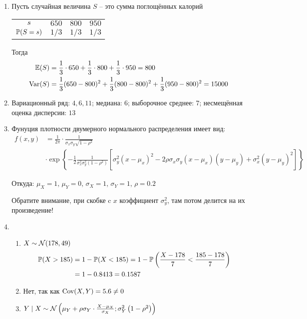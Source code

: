 \begin{enumerate}[resume]
\begin{enumerate}
\item Пусть случайная величина $S$ – это сумма поглощённых калорий

\begin{center}
\begin{tabular}{cccc}
\toprule
$s$ & $650$ & $800$ & $950$ \\
$\P(S = s)$ & $1/3$ & $1/3$ & $1/3$ \\ \bottomrule
\end{tabular}
\end{center}

Тогда
\begin{align*}
\E(S) &= \frac{1}{3}\cdot 650 +  \frac{1}{3}\cdot 800 +  \frac{1}{3}\cdot 950 = 800 \\
\Var(S) &= \frac{1}{3}(650-800)^2 + \frac{1}{3}(800-800)^2 + \frac{1}{3}(950-800)^2 = 15000
\end{align*}
\item Вариационный ряд: $4, 6, 11$; медиана: $6$; выборочное среднее: $7$;
несмещённая оценка дисперсии: $13$
\item Фунуция плотности двумерного нормального распределения имеет вид:
\begin{align*}
f(x,y) &= \frac{1}{2\pi}\cdot \frac{1}{\sigma_x \sigma_y \sqrt{1-\rho^2}} \\
&\cdot
\exp\left\{{-\frac{1}{2}\frac{1}{\sigma_x^2 \sigma_y^2\left(1-\rho^2\right)}\left[\sigma_y^2(x-\mu_x)^2-2\rho\sigma_x\sigma_y(x-\mu_x)(y-\mu_y)+\sigma_x^2(y-\mu_y)^2\right]}\right\}
\end{align*}

Откуда: $\mu_X=1$, $\mu_Y=0$, $\sigma_X = 1$, $\sigma_Y = 1$, $\rho = 0.2$

Обратите внимание, при скобке c $x$ коэффициент $\sigma^2_y$, там потом делится на их произведение!

\item
\begin{enumerate}
\item $X \sim \cN(178, 49)$
\begin{align*}
\P(X>185) &= 1  - \P(X<185) = 1- \P\left(\frac{X-178}{7} < \frac{185-178}{7}\right) \\
&= 1 - 0.8413 = 0.1587
\end{align*}
\item Нет, так как $\Cov(X, Y) = 5.6 \neq 0$
\item $Y \mid X \sim \cN\left(\mu_Y + \rho\sigma_Y\cdot\frac{X-\mu_X}{\sigma_X}; \sigma_Y^2\left(1-\rho^2\right)\right)$


\end{enumerate}
\end{enumerate}
\end{enumerate}
